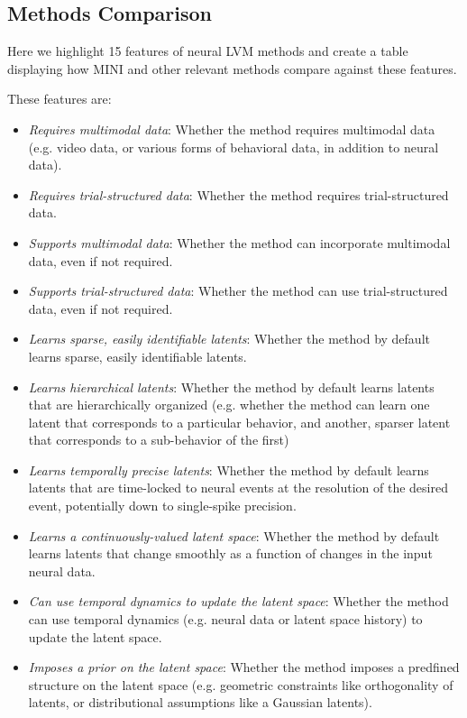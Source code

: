 

% 

\subsection{Methods Comparison}

Here we highlight 15 features of neural LVM methods and create a table displaying how MINI and other relevant methods compare against these features.

These features are:
\begin{itemize}
    \item \textit{Requires multimodal data}: Whether the method requires multimodal data (e.g. video data, or various forms of behavioral data, in addition to neural data).
    \item \textit{Requires trial-structured data}: Whether the method requires trial-structured data.
    \item \textit{Supports multimodal data}: Whether the method can incorporate multimodal data, even if not required.
    \item \textit{Supports trial-structured data}: Whether the method can use trial-structured data, even if not required.
    \item \textit{Learns sparse, easily identifiable latents}: Whether the method by default learns sparse, easily identifiable latents.
    \item \textit{Learns hierarchical latents}: Whether the method by default learns latents that are hierarchically organized (e.g. whether the method can learn one latent that corresponds to a particular behavior, and another, sparser latent that corresponds to a sub-behavior of the first)
    \item \textit{Learns temporally precise latents}: Whether the method by default learns latents that are time-locked to neural events at the resolution of the desired event, potentially down to single-spike precision.
    \item \textit{Learns a continuously-valued latent space}: Whether the method by default learns latents that change smoothly as a function of changes in the input neural data.
    \item \textit{Can use temporal dynamics to update the latent space}: Whether the method can use temporal dynamics (e.g. neural data or latent space history) to update the latent space.
    \item \textit{Imposes a prior on the latent space}: Whether the method imposes a predfined structure on the latent space (e.g. geometric constraints like orthogonality of latents, or distributional assumptions like a Gaussian latents).

\end{itemize}
